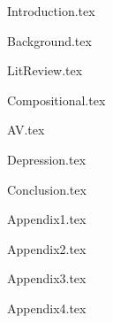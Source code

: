 \documentclass[a4paper,12pt,numbered,print,twoside]{uathesis}
\theoremstyle{remark}
\begin{document}
\onehalfspacing
\setcounter{tocdepth}{4}
\setcounter{secnumdepth}{4}
\tableofcontents
{}
\listoffigures
{}
\listoftables
{}
\printglossary[type=\acronymtype, nonumberlist, title={List of Acronyms}]

\mainmatter
\clearpage


{Introduction.tex}

{Background.tex}

{LitReview.tex}

{Compositional.tex}



{AV.tex}


{Depression.tex}


{Conclusion.tex}









\begin{appendices}
{Appendix1.tex}

{Appendix2.tex}

{Appendix3.tex}

{Appendix4.tex}
\end{appendices}

\backmatter








\end{document}
